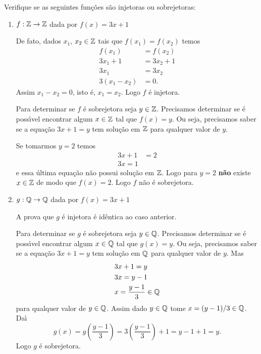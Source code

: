 \begin{exemplos}
	Verifique se as seguintes fun\c{c}\~oes s\~ao injetoras ou sobrejetoras:
	\begin{enumerate}[label={\arabic*})]
		\item $f : \mathbb{Z} \to \mathbb{Z}$ dada por $f(x) = 3x + 1$
			\begin{solucao}
				De fato, dados $x_1$, $x_2 \in \mathbb{Z}$ tais que $f(x_1) = f(x_2)$ temos
				\begin{align*}
					f(x_1) &= f(x_2)\\
					3x_1 + 1 &= 3x_2 + 1\\
					3x_1 &= 3x_2\\
					3(x_1 - x_2) &= 0.
				\end{align*}
				Assim $x_1 - x_2 = 0$, isto \'e, $x_1 = x_2$. Logo $f$ \'e injetora.

				Para determinar se $f$ \'e sobrejetora seja $y \in \mathbb{Z}$. Precisamos determinar se \'e poss{\'\i}vel encontrar algum $x \in \mathbb{Z}$ tal que $f(x) = y$. Ou seja, precisamos saber se a equa\c{c}\~ao $3x + 1 = y$ tem solu\c{c}\~ao em $\mathbb{Z}$ para qualquer valor de $y$.

				Se tomarmos $y = 2$ temos
				\begin{align*}
					3x + 1 &= 2\\
					3x = 1
				\end{align*}
				e essa \'ultima equa\c{c}\~ao n\~ao possui solu\c{c}\~ao em $\mathbb{Z}$. Logo para $y = 2$ \textbf{n\~ao} existe $x \in \mathbb{Z}$ de modo que $f(x) = 2$. Logo $f$ n\~ao \'e sobrejetora.
			\end{solucao}

		\item $g : \mathbb{Q} \to \mathbb{Q}$ dada por $f(x) = 3x + 1$
			\begin{solucao}
				A prova que $g$ \'e injetora \'e id\^entica ao caso anterior.

				Para determinar se $g$ \'e sobrejetora seja $y \in \mathbb{Q}$. Precisamos determinar se \'e poss{\'\i}vel encontrar algum $x \in \mathbb{Q}$ tal que $g(x) = y$. Ou seja, precisamos saber se a equa\c{c}\~ao $3x + 1 = y$ tem solu\c{c}\~ao em $\mathbb{Q}$ para qualquer valor de $y$. Mas
				\begin{align*}
					&3x + 1 = y\\
					&3x = y - 1\\
					&x = \dfrac{y - 1}{3} \in \mathbb{Q}
				\end{align*}
				para qualquer valor de $y \in \mathbb{Q}$. Assim dado $y \in \mathbb{Q}$ tome $x = (y - 1)/3 \in \mathbb{Q}$. Da{\'\i}
				\[
					g(x) = g\left(\dfrac{y - 1}{3}\right) = 3\left(\dfrac{y - 1}{3}\right) + 1 = y - 1 + 1 = y.
				\]
				Logo $g$ \'e sobrejetora.
			\end{solucao}


\end{enumerate}
\end{exemplos}
